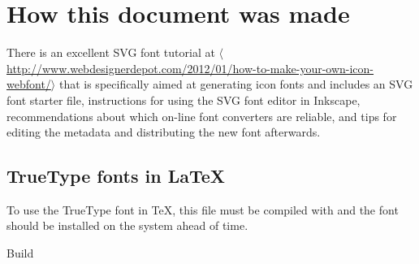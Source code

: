 \documentclass[10pt,letterpaper]{article}
\newcommand{\URL}[1]{$\langle$\url{#1}$\rangle$}
\begin{document}
\section{How this document was made}

There is an excellent SVG font tutorial at
\URL{http://www.webdesignerdepot.com/2012/01/how-to-make-your-own-icon-webfont/}
that is specifically aimed at generating icon fonts and includes an SVG font
starter file, instructions for using the SVG font editor in Inkscape,
recommendations about which on-line font converters are reliable, and tips for
editing the metadata and distributing the new font afterwards.

\subsection{TrueType fonts in {\LaTeX}}

To use the TrueType font in \TeX, this file must be compiled with 
and the font should be installed on the system ahead of time.




\vfill
{\tiny Build }
\end{document}
